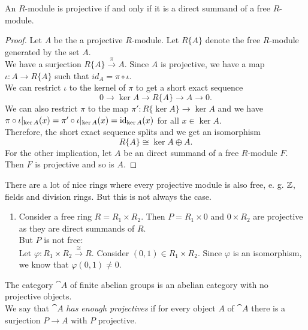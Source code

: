 \begin{proposition}
	An $R$-module is projective if and only if it is a direct summand of a free $R$-module.
\end{proposition}

\begin{proof}
	Let $A$ be the a projective $R$-module. Let $R\{A\}$ denote the free $R$-module generated by the set $A$. \\
	We have a surjection $R\{A\}\overset{\pi}{\longrightarrow}A$.
	Since $A$ is projective, we have a map $\iota:A\rightarrow R\{A\}$ such that $id_A=\pi\circ\iota$. \\
	We can restrict $\iota$ to the kernel of $\pi$ to get a short exact sequence
	$$0\rightarrow \ker A \rightarrow R\{A\} \rightarrow A \rightarrow 0.$$
	We can also restrict $\pi$ to the map $\pi':R\{\ker A\}\rightarrow \ker A$ and we have $\pi\circ\iota\vert_{\ker A}(x) = \pi'\circ\iota\vert_{\ker A}(x) = \operatorname{id}_{\ker A}(x)$ for all $x\in\ker A$. \\
	Therefore, the short exact sequence splits and we get an isomorphism $$R\{A\}\cong \ker A \oplus A.$$
	For the other implication, let $A$ be an direct summand of a free $R$-module $F$. Then $F$ is projective and so is $A$. 
\end{proof}

\begin{example}
	There are a lot of nice rings where every projective module is also free, e. g. ${\mathbb Z}$, fields and division rings.
	But this is not always the case.
	\begin{enumerate}[label=(\roman*)]
		\item Consider a free ring $R=R_1\times R_2$. Then $P=R_1\times 0$ and $0\times R_2$ are projective as they are direct summands of $R$. \\
		But $P$ is not free: \\
		Let $\varphi:R_1\times R_2 \overset{\cong}{\longrightarrow} R$. Consider $(0,1)\in R_1\times R_2$.
		Since $\varphi$ is an isomorphism, we know that $\varphi(0,1)\neq0$.
	\end{enumerate}
\end{example}

\begin{remark}
	The category $\cat{A}$ of finite abelian groups is an abelian category with no projective objects. \\
	We say that $\cat{A}$ \textit{has enough projectives} if for every object $A$ of $\cat{A}$ there is a surjection $P\rightarrow A$ with $P$ projective.
\end{remark}

